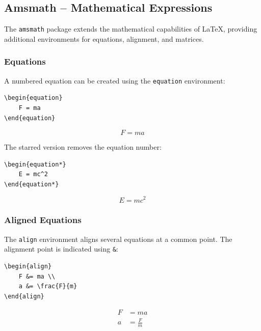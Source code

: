 \subsection{Amsmath -- Mathematical Expressions}

The \texttt{amsmath} package extends the mathematical capabilities
of \LaTeX, providing additional environments for equations,
alignment, and matrices.


\subsubsection{Equations}

A numbered equation can be created using the \texttt{equation}
environment:

\begin{lstlisting}[style=latex]
\begin{equation}
    F = ma
\end{equation}
\end{lstlisting}

\begin{equation}
    F = ma
\end{equation}

The starred version removes the equation number:

\begin{lstlisting}[style=latex]
\begin{equation*}
    E = mc^2
\end{equation*}
\end{lstlisting}

\begin{equation*}
    E = mc^2
\end{equation*}


\subsubsection{Aligned Equations}

The \texttt{align} environment aligns several equations at a
common point. The alignment point is indicated using \verb|&|:

\begin{lstlisting}[style=latex]
\begin{align}
    F &= ma \\
    a &= \frac{F}{m}
\end{align}
\end{lstlisting}

\begin{align}
    F &= ma \\
    a &= \frac{F}{m}
\end{align}


